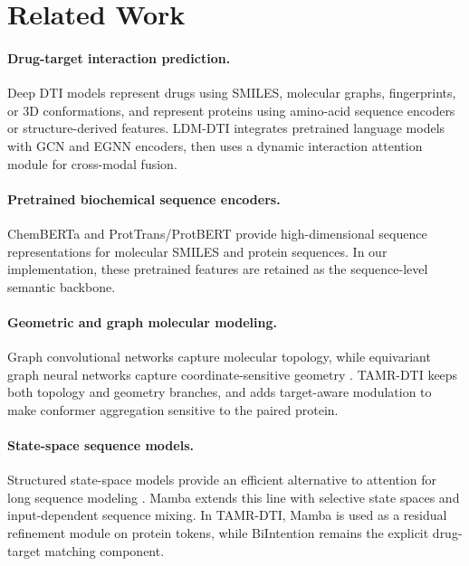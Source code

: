 \section{Related Work}

\paragraph{Drug-target interaction prediction.}
Deep DTI models represent drugs using SMILES, molecular graphs, fingerprints, or 3D conformations, and represent proteins using amino-acid sequence encoders or structure-derived features. LDM-DTI \citep{ji2026ldmdti} integrates pretrained language models with GCN and EGNN encoders, then uses a dynamic interaction attention module for cross-modal fusion.

\paragraph{Pretrained biochemical sequence encoders.}
ChemBERTa \citep{chithrananda2020chemberta} and ProtTrans/ProtBERT \citep{elnaggar2021prottrans} provide high-dimensional sequence representations for molecular SMILES and protein sequences. In our implementation, these pretrained features are retained as the sequence-level semantic backbone.

\paragraph{Geometric and graph molecular modeling.}
Graph convolutional networks capture molecular topology, while equivariant graph neural networks capture coordinate-sensitive geometry \citep{satorras2021egnn}. TAMR-DTI keeps both topology and geometry branches, and adds target-aware modulation to make conformer aggregation sensitive to the paired protein.

\paragraph{State-space sequence models.}
Structured state-space models provide an efficient alternative to attention for long sequence modeling \citep{gu2022s4}. Mamba \citep{gu2023mamba} extends this line with selective state spaces and input-dependent sequence mixing. In TAMR-DTI, Mamba is used as a residual refinement module on protein tokens, while BiIntention remains the explicit drug-target matching component.
